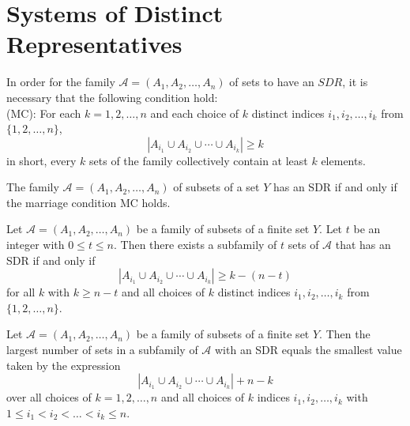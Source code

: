 \chapter{Systems of Distinct Representatives}

\begin{theorem}
  \label{thm:9.2.1}
  In order for the family $\mathcal{A} = (A_1, A_2 ,\ldots , A_n)$ of sets to have an $SDR$, it is 
  necessary that the following condition hold:\\
  (MC): For each $k=1,2, \ldots, n$ and each choice of $k$ distinct indices $i_1, i_2, \ldots, i_k$ 
  from $\{1,2, \ldots, n\}$,
  \begin{equation}\label{9.1}
    \left|A_{i_1} \cup A_{i_2} \cup \cdots \cup A_{i_k}\right| \geq k  
  \end{equation}
  in short, every $k$ sets of the family collectively contain at least $k$ elements.
\end{theorem}

\begin{theorem}
  \label{thm:9.2.2}
  The family $\mathcal{A} = (A_1, A_2 ,\ldots , A_n)$ of subsets of a set $Y$ has an SDR if and only
  if the marriage condition MC holds.
\end{theorem}

\begin{theorem}
  \label{thm:9.2.3}
  Let $\mathcal{A} = (A_1, A_2 ,\ldots , A_n)$ be a family of subsets of a finite set $Y$. Let $t$ 
  be an integer with $0 \leq t \leq n$. Then there exists a subfamily of $t$ sets of $\mathcal{A}$ 
  that has an SDR if and only if
  \begin{equation}\label{9.2}
    \left|A_{i_1} \cup A_{i_2} \cup \cdots \cup A_{i_k}\right| \geq k - (n -t) 
  \end{equation}
  for all $k$ with $k \geq n-t$ and all choices of $k$ distinct indices $i_1, i_2, \ldots, i_k$ 
  from $\{1,2, \ldots, n\}$.
\end{theorem}

\begin{theorem}
  \label{thm:9.2.4}
  Let $\mathcal{A} = (A_1, A_2 ,\ldots , A_n)$ be a family of subsets of a finite set $Y$. Then the 
  largest number of sets in a subfamily of $\mathcal{A}$ with an SDR equals the smallest value taken
  by the expression
  \begin{equation}\label{9.4}
    \left|A_{i_1} \cup A_{i_2} \cup \cdots \cup A_{i_k}\right| + n -k
  \end{equation}
  over all choices of $k = 1,2, \ldots ,n$ and all choices of $k$ indices $i_1, i_2, \ldots, i_k$ 
  with $1 \leq i_1 < i_2 <\ldots< i_k \leq n$.
\end{theorem}

